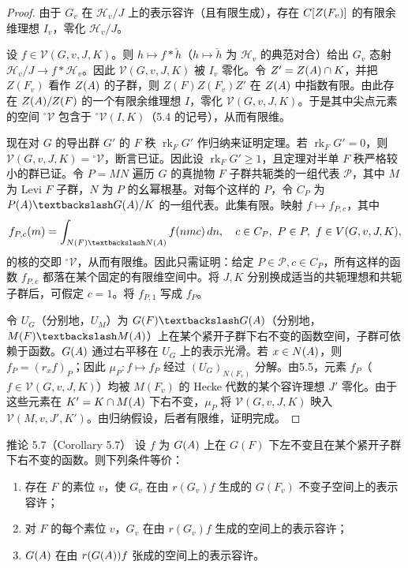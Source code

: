 \begin{proof}
由于 $G_v$ 在 $\mathcal H_v/J$ 上的表示容许（且有限生成），存在 $C[Z(F_v)]$ 的有限余维理想 $I_v$，零化 $\mathcal H_v/J$。

设 $f\in\mathcal V(G,v,J,K)$。则 $h\mapsto f*\check h$（$h\mapsto\check h$ 为 $\mathcal H_v$ 的典范对合）给出 $G_v$ 态射 $\mathcal H_v/J\to f*\mathcal H_v$。因此 $\mathcal V(G,v,J,K)$ 被 $I_v$ 零化。令 $Z'=Z(A)\cap K$，并把 $Z(F_v)$ 看作 $Z(A)$ 的子群，则 $Z(F)Z(F_v)Z'$ 在 $Z(A)$ 中指数有限。由此存在 $Z(A)/Z(F)$ 的一个有限余维理想 $I$，零化 $\mathcal V(G,v,J,K)$。于是其中尖点元素的空间 $^\circ\mathcal V$ 包含于 $^\circ\mathcal V(I,K)$（5.4 的记号），从而有限维。

现在对 $G$ 的导出群 $G'$ 的 $F$ 秩 $\operatorname{rk}_FG'$ 作归纳来证明定理。若 $\operatorname{rk}_FG'=0$，则 $\mathcal V(G,v,J,K)={}^\circ\mathcal V$，断言已证。因此设 $\operatorname{rk}_FG'\geq1$，且定理对半单 $F$ 秩严格较小的群已证。令 $P=MN$ 遍历 $G$ 的真抛物 $F$ 子群共轭类的一组代表 $\mathcal P$，其中 $M$ 为 Levi $F$ 子群，$N$ 为 $P$ 的幺幂根基。对每个这样的 $P$，令 $C_P$ 为 $P(\A)\backslash G(\A)/K$ 的一组代表。此集有限。映射 $f\mapsto f_{P,c}$，其中
\[
f_{P,c}(m)=\int_{N(F)\backslash N(\A)}f(nmc)\,dn,
\quad c\in C_P,\ P\in\mathcal P,\ f\in\mathcal V(G,v,J,K),
\]
的核的交即 $^\circ\mathcal V$，从而有限维。因此只需证明：给定 $P\in\mathcal P,c\in C_P$，所有这样的函数 $f_{P,c}$ 都落在某个固定的有限维空间中。将 $J,K$ 分别换成适当的共轭理想和共轭子群后，可假定 $c=1$。将 $f_{P,1}$ 写成 $f_P$。

令 $U_G$（分别地，$U_M$）为 $G(F)\backslash G(\A)$（分别地，$M(F)\backslash M(\A)$）上在某个紧开子群下右不变的函数空间，子群可依赖于函数。$G(A)$ 通过右平移在 $U_G$ 上的表示光滑。若 $x\in N(A)$，则 $f_P=(r_xf)_P$；因此 $\mu_P:f\mapsto f_P$ 经过 $(U_G)_{N(F_v)}$ 分解。由5.5，元素 $f_P$（$f\in\mathcal V(G,v,J,K)$）均被 $M(F_v)$ 的 Hecke 代数的某个容许理想 $J'$ 零化。由于这些元素在 $K'=K\cap M(A)$ 下右不变，$\mu_P$ 将 $\mathcal V(G,v,J,K)$ 映入 $\mathcal V(M,v,J',K')$。由归纳假设，后者有限维，证明完成。
\end{proof}
\begin{originaltheorem}{推论 5.7（Corollary 5.7）}
设 $f$ 为 $G(A)$ 上在 $G(F)$ 下左不变且在某个紧开子群下右不变的函数。则下列条件等价：
\begin{enumerate}
\item[(1)] 存在 $F$ 的素位 $v$，使 $G_v$ 在由 $r(G_v)f$ 生成的 $G(F_v)$ 不变子空间上的表示容许；
\item[(2)] 对 $F$ 的每个素位 $v$，$G_v$ 在由 $r(G_v)f$ 生成的空间上的表示容许；
\item[(3)] $G(A)$ 在由 $r(G(A))f$ 张成的空间上的表示容许。
\end{enumerate}
\end{originaltheorem}
